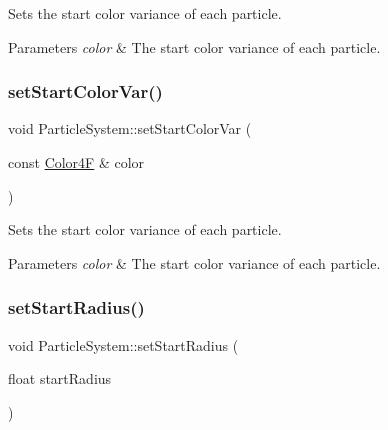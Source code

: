 Sets the start color variance of each particle.


\begin{DoxyParams}{Parameters}
{\em color} & The start color variance of each particle. \\
\hline
\end{DoxyParams}
\mbox{\label{classParticleSystem_ac18c55ba53459fe1c48ba14bdd2f2924}} 
\subsubsection{\texorpdfstring{set\+Start\+Color\+Var()}{setStartColorVar()}\hspace{0.1cm}{\footnotesize\ttfamily [2/2]}}
{\footnotesize\ttfamily void Particle\+System\+::set\+Start\+Color\+Var (\begin{DoxyParamCaption}\item[{const \hyperlink{structColor4F}{Color4F} \&}]{color }\end{DoxyParamCaption})\hspace{0.3cm}{\ttfamily [inline]}}

Sets the start color variance of each particle.


\begin{DoxyParams}{Parameters}
{\em color} & The start color variance of each particle. \\
\hline
\end{DoxyParams}
\mbox{\label{classParticleSystem_a1a46e9c7b5df5892ba149e1e13ff177f}} 
\subsubsection{\texorpdfstring{set\+Start\+Radius()}{setStartRadius()}\hspace{0.1cm}{\footnotesize\ttfamily [1/2]}}
{\footnotesize\ttfamily void Particle\+System\+::set\+Start\+Radius (\begin{DoxyParamCaption}\item[{float}]{start\+Radius }\end{DoxyParamCaption})\hspace{0.3cm}{\ttfamily [virtual]}}

